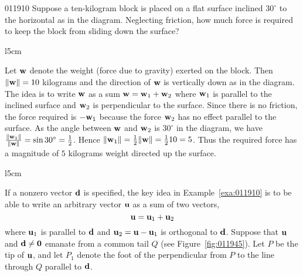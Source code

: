 \begin{example}{}{011910}
Suppose
 a ten-kilogram block is placed on a flat surface inclined $30^{\circ}$  to the 
horizontal as in the diagram. Neglecting friction, how much force is 
required to keep the block from sliding down the surface?



\begin{wrapfigure}[6]{l}{5cm} 
\centering

\end{wrapfigure}

\setlength{\rightskip}{0pt plus 200pt}
\begin{solution}  Let $\textbf{w}$ denote the weight (force due to gravity) exerted on the block. Then $\|\textbf{w}\| = 10$ kilograms and the direction of $\textbf{w}$ is vertically down as in the diagram. The idea is to write $\textbf{w}$ as a sum $\textbf{w} = \textbf{w}_{1} + \textbf{w}_{2}$ where $\textbf{w}_{1}$ is parallel to the inclined surface and $\textbf{w}_{2}$ is perpendicular to the surface. Since there is no friction, the force required is $-\textbf{w}_{1}$ because the force $\textbf{w}_{2}$ has no effect parallel to the surface. As the angle between $\textbf{w}$ and $\textbf{w}_{2}$ is $30^{\circ}$  in the diagram, we have $\tfrac{\| \textbf{w}_{1} \|}{\| \textbf{w} \|} = \sin30^\circ = \tfrac{1}{2}$. Hence $\| \textbf{w}_{1} \| = \tfrac{1}{2} \| \textbf{w} \| = \tfrac{1}{2}10 = 5$. Thus the required force has a magnitude of $5$ kilograms weight directed up the surface.

\end{solution}
\end{example}


\newpage
\begin{wrapfigure}[11]{l}{5cm}
\vspace{-1em}
\centering


\vspace*{-1em}\caption{\label{fig:011945}}
\end{wrapfigure}

If a nonzero vector $\textbf{d}$ is specified, the key idea in Example~\ref{exa:011910} is to be able to write an arbitrary vector $\textbf{u}$ as a sum of two vectors,
\begin{equation*}
\textbf{u} = \textbf{u}_{1} + \textbf{u}_{2}
\end{equation*}
where $\textbf{u}_{1}$ is parallel to $\textbf{d}$ and $\textbf{u}_{2} = \textbf{u} - \textbf{u}_{1}$ is orthogonal to $\textbf{d}$. Suppose that $\textbf{u}$ and $\textbf{d} \neq \textbf{0}$ emanate from a common tail $Q$ (see Figure~\ref{fig:011945}). Let $P$ be the tip of $\textbf{u}$, and let $P_{1}$ denote the foot of the perpendicular from $P$ to the line through $Q$ parallel to $\textbf{d}$. 

